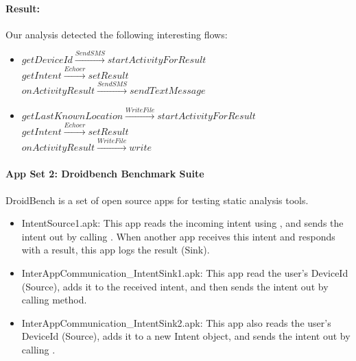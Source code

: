 {\begin{sloppypar}
\begin{itemize}
\paragraph{Result:}
Our analysis detected the following interesting flows:
\begin{flushleft}
\begin{itemize}[leftmargin=*]
\item
$getDeviceId \xrightarrow{SendSMS} startActivityForResult $
\\
$getIntent \xrightarrow{Echoer} setResult $
\\
$onActivityResult \xrightarrow{SendSMS}sendTextMessage$

\item 
$getLastKnownLocation  \xrightarrow{\!WriteFile\!} startActivityForResult  $
\\
$getIntent  \xrightarrow{Echoer} setResult  $
\\
$onActivityResult  \xrightarrow{WriteFile} write$
\end{itemize}
\end{flushleft}
\end{itemize}
\end{sloppypar}

\paragraph{App Set 2: Droidbench Benchmark Suite}
\begin{sloppypar}
DroidBench is a set of open source apps for testing static analysis tools.
\begin{itemize}
\item
IntentSource1.apk: This app reads the incoming intent using , and sends the intent out by calling . When another app receives this intent and responds with a result, this app logs the result (Sink).
\item
InterAppCommunication\_IntentSink1.apk: This app read the user's DeviceId (Source), adds it to the received intent, and then sends the intent out by calling  method.
\item
InterAppCommunication\_IntentSink2.apk: This app also reads the user's DeviceId (Source), adds it to a new Intent object, and sends the intent out by calling .

\end{itemize}
\end{sloppypar}}
